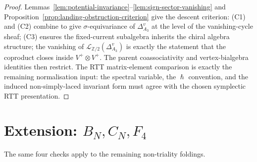\documentclass[11pt]{amsart}
\theoremstyle{definition}
\theoremstyle{remark}
\renewcommand{\hbar}{\hslash}
\begin{document}
\begin{proof}
Lemmas~\ref{lem:potential-invariance}--\ref{lem:sign-sector-vanishing}
and Proposition~\ref{prop:landing-obstruction-criterion} give the
descent criterion: (C1) and (C2) combine to give
$\sigma$-equivariance of $\Delta^v_{A_3}$ at the level of the
vanishing-cycle sheaf; (C3) ensures the fixed-current subalgebra
inherits the chiral algebra structure; the vanishing of
$\mathcal L_{\mathbb Z/2}(\Delta^v_{A_3})$ is exactly the statement
that the coproduct closes inside $V^+ \otimes V^+$. The parent
coassociativity and vertex-bialgebra identities then restrict. The RTT
matrix-element comparison is exactly the remaining normalisation input:
the spectral variable, the $\hbar$ convention, and the induced
non-simply-laced invariant form must agree with the chosen symplectic
RTT presentation.
\end{proof}

\section{Extension: $B_N, C_N, F_4$}
\label{sec:extension-BCF}

The same four checks apply to the remaining non-triality foldings.
\end{document}

